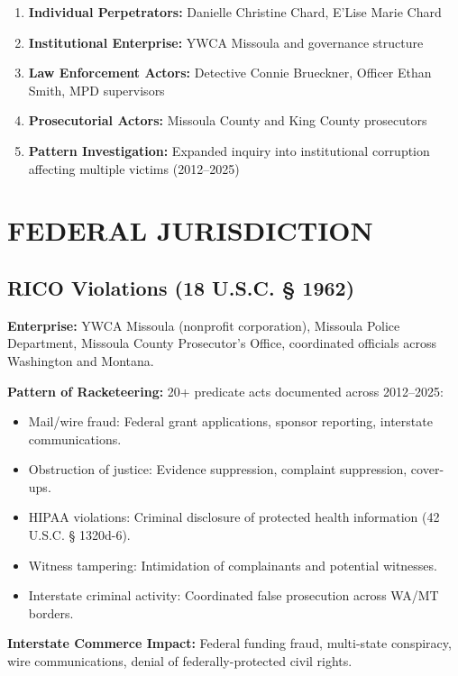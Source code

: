 \documentclass[12pt,oneside]{article}
\begin{document}
\begin{flushleft}
\begin{enumerate}
\item \textbf{Individual Perpetrators:} Danielle Christine Chard, E'Lise Marie Chard
\item \textbf{Institutional Enterprise:} YWCA Missoula and governance structure
\item \textbf{Law Enforcement Actors:} Detective Connie Brueckner, Officer Ethan Smith, MPD supervisors
\item \textbf{Prosecutorial Actors:} Missoula County and King County prosecutors
\item \textbf{Pattern Investigation:} Expanded inquiry into institutional corruption affecting multiple victims (2012--2025)
\end{enumerate}

\section*{FEDERAL JURISDICTION}

\subsection*{RICO Violations (18 U.S.C. § 1962)}

\textbf{Enterprise:} YWCA Missoula (nonprofit corporation), Missoula Police Department, Missoula County Prosecutor's Office, coordinated officials across Washington and Montana.

\textbf{Pattern of Racketeering:} 20+ predicate acts documented across 2012--2025:

\begin{itemize}
\item Mail/wire fraud: Federal grant applications, sponsor reporting, interstate communications.
\item Obstruction of justice: Evidence suppression, complaint suppression, cover-ups.
\item HIPAA violations: Criminal disclosure of protected health information (42 U.S.C. § 1320d-6).
\item Witness tampering: Intimidation of complainants and potential witnesses.
\item Interstate criminal activity: Coordinated false prosecution across WA/MT borders.
\end{itemize}

\textbf{Interstate Commerce Impact:} Federal funding fraud, multi-state conspiracy, wire communications, denial of federally-protected civil rights.


\end{flushleft}
\end{document}
